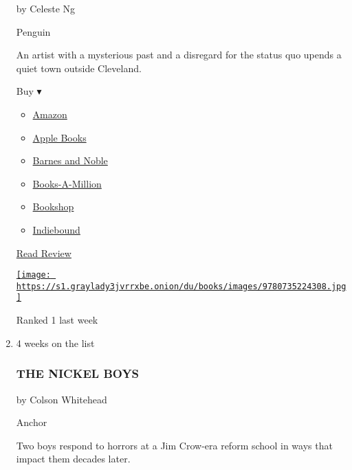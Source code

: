\begin{enumerate}
  by Celeste Ng

  Penguin

  An artist with a mysterious past and a disregard for the status quo
  upends a quiet town outside Cleveland.

  Buy ▾

  \begin{itemize}
  \tightlist
  \item
    \href{https://www.amazon.com/Little-Fires-Everywhere-Celeste-Ng-ebook/dp/B01N4VW75U?tag=NYTBS-20}{Amazon}
  \item
    \href{https://du-gae-books-dot-nyt-du-prd.appspot.com/buy?title=LITTLE+FIRES+EVERYWHERE\&author=Celeste+Ng}{Apple
    Books}
  \item
    \href{https://www.anrdoezrs.net/click-7990613-11819508?url=https\%3A\%2F\%2Fwww.barnesandnoble.com\%2Fw\%2F\%3Fean\%3D9780735224315}{Barnes
    and Noble}
  \item
    \href{https://www.anrdoezrs.net/click-7990613-35140?url=https\%3A\%2F\%2Fwww.booksamillion.com\%2Fp\%2FLITTLE\%2BFIRES\%2BEVERYWHERE\%2FCeleste\%2BNg\%2F9780735224315}{Books-A-Million}
  \item
    \href{https://bookshop.org/a/3546/9780735224315}{Bookshop}
  \item
    \href{https://www.indiebound.org/book/9780735224315?aff=NYT}{Indiebound}
  \end{itemize}

  \href{https://www.nytimes3xbfgragh.onion/2017/09/25/books/review/little-fires-everywhere-celeste-ng.html}{Read
  Review}

  \href{https://www.nytimes3xbfgragh.onion/2017/09/25/books/review/little-fires-everywhere-celeste-ng.html}{\texttt{[image: https://s1.graylady3jvrrxbe.onion/du/books/images/9780735224308.jpg]}}

  Ranked 1 last week
\item
  \href{https://www.nytimes3xbfgragh.onion/2019/07/11/books/review-nickel-boys-colson-whitehead.html}{}

  4 weeks on the list

  \hypertarget{the-nickel-boys}{%
  \subsubsection{THE NICKEL BOYS}\label{the-nickel-boys}}

  by Colson Whitehead

  Anchor

  Two boys respond to horrors at a Jim Crow-era reform school in ways
  that impact them decades later.


\end{enumerate}
